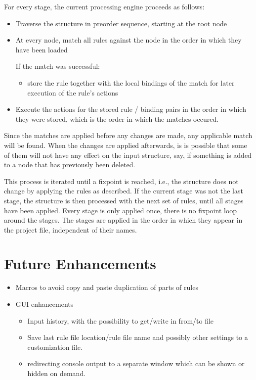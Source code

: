 \documentclass[11pt,a4paper]{article}
\begin{document}
For every stage, the current processing engine proceeds as follows:
\begin{itemize}
\item Traverse the structure in preorder sequence, starting at the root node
\item At every node, match all rules against the node in the order in which
  they have been loaded

  \noindent{}If the match was successful:\\[-3.4ex]
  \begin{itemize}
  \item[] store the rule together with the
    local bindings of the match for later execution of the rule's actions
  \end{itemize}
\item Execute the actions for the stored rule / binding pairs in the order in
  which they were stored, which is the order in which the matches occured.
\end{itemize}

Since the matches are applied before any changes are made, any applicable match
will be found. When the changes are applied afterwards, is is possible that
some of them will not have any effect on the input structure, say, if something
is added to a node that has previously been deleted.

This process is iterated until a fixpoint is reached, i.e., the structure does
not change by applying the rules as described. If the current stage was not the
last stage, the structure is then processed with the next set of rules, until
all stages have been applied. Every stage is only applied once, there is no
fixpoint loop around the stages. The stages are applied in the order in which
they appear in the project file, independent of their names.

\section{Future Enhancements}
\begin{itemize}
\item Macros to avoid copy and paste duplication of parts of rules
\item GUI enhancements
  \begin{itemize}
  \item Input history, with the possibility to get/write in from/to file
  \item Save last rule file location/rule file name and possibly other settings
    to a customization file.
  \item redirecting console output to a separate window which can be shown or
    hidden on demand.
  \end{itemize}
\end{itemize}
\fi
\end{document}
